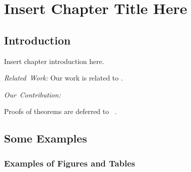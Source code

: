 \chapter{Insert Chapter Title Here}
\label{Section:ChapAbbr}



\section{Introduction}
\label{Section:ChapAbbr:Introduction}

Insert chapter introduction here.
\lipsum[1-2]

\mbox{\textit{Related Work:}}
Our work is related to \cite{Examples:Conference01, Examples:Journal01, Examples:Conference02, Examples:Journal02, Examples:Conference03}.
\lipsum[3-4]

\mbox{\textit{Our Contribution:}}
\lipsum[5-6]

Proofs of theorems are deferred to \Section~.


\section{Some Examples}
\label{Section:ChapAbbr:SomeExamples}

\lipsum[7]


\subsection{Examples of Figures and Tables}
\label{Section:ChapAbbr:SomeExamples:FiguresTables}

